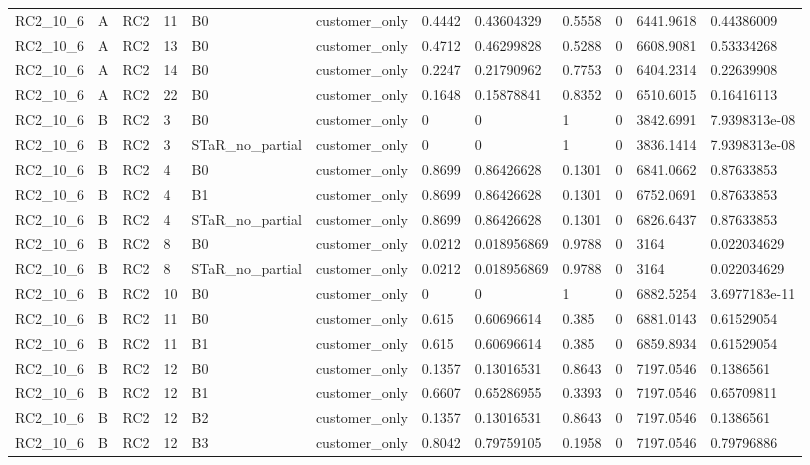 \begin{longtable}{llllllllllll}
RC2\_10\_6 & A & RC2 & 11 & B0 & customer\_only & 0.4442 & 0.43604329 & 0.5558 & 0 & 6441.9618 & 0.44386009 \\
RC2\_10\_6 & A & RC2 & 13 & B0 & customer\_only & 0.4712 & 0.46299828 & 0.5288 & 0 & 6608.9081 & 0.53334268 \\
RC2\_10\_6 & A & RC2 & 14 & B0 & customer\_only & 0.2247 & 0.21790962 & 0.7753 & 0 & 6404.2314 & 0.22639908 \\
RC2\_10\_6 & A & RC2 & 22 & B0 & customer\_only & 0.1648 & 0.15878841 & 0.8352 & 0 & 6510.6015 & 0.16416113 \\
RC2\_10\_6 & B & RC2 & 3 & B0 & customer\_only & 0 & 0 & 1 & 0 & 3842.6991 & 7.9398313e-08 \\
RC2\_10\_6 & B & RC2 & 3 & STaR\_no\_partial & customer\_only & 0 & 0 & 1 & 0 & 3836.1414 & 7.9398313e-08 \\
RC2\_10\_6 & B & RC2 & 4 & B0 & customer\_only & 0.8699 & 0.86426628 & 0.1301 & 0 & 6841.0662 & 0.87633853 \\
RC2\_10\_6 & B & RC2 & 4 & B1 & customer\_only & 0.8699 & 0.86426628 & 0.1301 & 0 & 6752.0691 & 0.87633853 \\
RC2\_10\_6 & B & RC2 & 4 & STaR\_no\_partial & customer\_only & 0.8699 & 0.86426628 & 0.1301 & 0 & 6826.6437 & 0.87633853 \\
RC2\_10\_6 & B & RC2 & 8 & B0 & customer\_only & 0.0212 & 0.018956869 & 0.9788 & 0 & 3164 & 0.022034629 \\
RC2\_10\_6 & B & RC2 & 8 & STaR\_no\_partial & customer\_only & 0.0212 & 0.018956869 & 0.9788 & 0 & 3164 & 0.022034629 \\
RC2\_10\_6 & B & RC2 & 10 & B0 & customer\_only & 0 & 0 & 1 & 0 & 6882.5254 & 3.6977183e-11 \\
RC2\_10\_6 & B & RC2 & 11 & B0 & customer\_only & 0.615 & 0.60696614 & 0.385 & 0 & 6881.0143 & 0.61529054 \\
RC2\_10\_6 & B & RC2 & 11 & B1 & customer\_only & 0.615 & 0.60696614 & 0.385 & 0 & 6859.8934 & 0.61529054 \\
RC2\_10\_6 & B & RC2 & 12 & B0 & customer\_only & 0.1357 & 0.13016531 & 0.8643 & 0 & 7197.0546 & 0.1386561 \\
RC2\_10\_6 & B & RC2 & 12 & B1 & customer\_only & 0.6607 & 0.65286955 & 0.3393 & 0 & 7197.0546 & 0.65709811 \\
RC2\_10\_6 & B & RC2 & 12 & B2 & customer\_only & 0.1357 & 0.13016531 & 0.8643 & 0 & 7197.0546 & 0.1386561 \\
RC2\_10\_6 & B & RC2 & 12 & B3 & customer\_only & 0.8042 & 0.79759105 & 0.1958 & 0 & 7197.0546 & 0.79796886 \\

\end{longtable}
